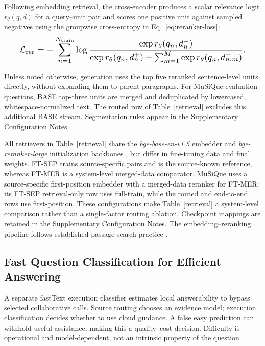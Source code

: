 \documentclass[a4paper,fleqn]{cas-dc}
\begin{document}
Following embedding retrieval, the cross-encoder produces a scalar relevance logit \(r_{\theta}(q,d)\) for a query--unit pair and scores one positive unit against sampled negatives using the groupwise cross-entropy in Eq.~\eqref{eq:reranker-loss}:
\begin{equation}\label{eq:reranker-loss}
\resizebox{0.92\columnwidth}{!}{$\displaystyle
\mathcal{L}_{\text{rer}}=-\sum_{n=1}^{N_{\mathrm{train}}}\log
\frac{\exp r_{\theta}(q_n,d_n^+)}{\exp r_{\theta}(q_n,d_n^+)+\sum_{m=1}^{M}\exp r_{\theta}(q_n,d_{n,m}^-)}.
$}
\end{equation}

Unless noted otherwise, generation uses the top five reranked sentence-level units directly, without expanding them to parent paragraphs. For MuSiQue evaluation questions, BASE top-three units are merged and deduplicated by lowercased, whitespace-normalized text. The routed row of Table~\ref{retrieval} excludes this additional BASE stream. Segmentation rules appear in the Supplementary Configuration Notes.

All retrievers in Table~\ref{retrieval} share the \textit{bge-base-en-v1.5} embedder and \textit{bge-reranker-large} initialization backbones \cite{xiao2024c}, but differ in fine-tuning data and final weights. FT-SEP trains source-specific pairs and is the source-known reference, whereas FT-MER is a system-level merged-data comparator. MuSiQue uses a source-specific first-position embedder with a merged-data reranker for FT-MER; its FT-SEP retrieval-only row uses full-train, while the routed and end-to-end rows use first-position. These configurations make Table~\ref{retrieval} a system-level comparison rather than a single-factor routing ablation. Checkpoint mappings are retained in the Supplementary Configuration Notes. The embedding--reranking pipeline follows established passage-search practice \cite{khattab2020colbert,nogueira2019passage}.

\subsection{Fast Question Classification for Efficient Answering}
A separate fastText execution classifier estimates local answerability to bypass selected collaborative calls. Source routing chooses an evidence model; execution classification decides whether to use cloud guidance. A false easy prediction can withhold useful assistance, making this a quality--cost decision. Difficulty is operational and model-dependent, not an intrinsic property of the question.
\end{document}
